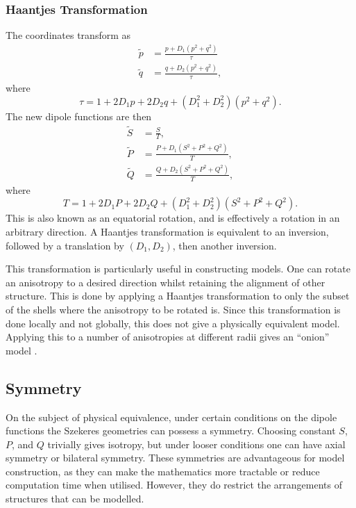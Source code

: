 \documentclass[a4paper,12pt]{report}
\begin{document}
\subsubsection{Haantjes Transformation}
The coordinates transform as
\begin{subequations}  \label{eqn: haantjes transformation - coordinates}
    \begin{align}
      \tilde{p} &= \frac{p + D_1 (p^2 + q^2)}{\tau}\\
      \tilde{q} &= \frac{q+D_2(p^2+q^2)}{\tau},
    \end{align}
\end{subequations}
where
\begin{equation}
  \tau = 1+2D_1p+2D_2q+(D_1^2+D_2^2)(p^2+q^2).
\end{equation}
The new dipole functions are then
\begin{subequations}\label{eqn: Haantjes tranform dipole functions}
    \begin{align}
      \tilde{S} &= \frac{S}{T}, \\
      \tilde{P} &= \frac{P + D_1 (S^2+P^2 + Q^2)}{T},\\
      \tilde{Q} &= \frac{Q+D_2(S^2+P^2+Q^2)}{T},
    \end{align}
\end{subequations}
where
\begin{equation}
  T = 1+2D_1P+2D_2Q+(D_1^2+D_2^2)(S^2+P^2+Q^2).
\end{equation}
This is also known as an equatorial rotation, and is effectively a rotation in an arbitrary direction. A Haantjes transformation is equivalent to an inversion, followed by a translation by $(D_1,D_2)$, then another inversion.

This transformation is particularly useful in constructing models. One can rotate an anisotropy to a desired direction whilst retaining the alignment of other structure. This is done by applying a Haantjes transformation to only the subset of the shells where the anisotropy to be rotated is. Since this transformation is done locally and not globally, this does not give a physically equivalent model. Applying this to a number of anisotropies at different radii gives an ``onion'' model \cite{RN1}.

\subsection{Symmetry}
On the subject of physical equivalence, under certain conditions on the dipole functions the Szekeres geometries can possess a symmetry. Choosing constant $S$, $P$, and $Q$ trivially gives isotropy, but under looser conditions one can have axial symmetry or bilateral symmetry. These symmetries are advantageous for model construction, as they can make the mathematics more tractable or reduce computation time when utilised. However, they do restrict the arrangements of structures that can be modelled.
\end{document}
